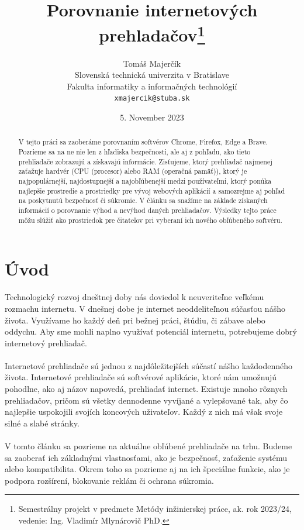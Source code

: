\documentclass[10pt,Slovak,a4paper]{article}
\title{Porovnanie internetových prehladačov\thanks{Semestrálny projekt v predmete Metódy inžinierskej práce, ak. rok 2023/24, vedenie: Ing. Vladimír Mlynárovič PhD.}} %
\author{Tomáš Majerčík\\[2pt]
	{\small Slovenská technická univerzita v Bratislave}\\
	{\small Fakulta informatiky a informačných technológií}\\
	{\small \texttt{xmajercik@stuba.sk}}
}
\date{\small 5. November 2023} %
\begin{document}
\maketitle

\begin{abstract}

V tejto práci sa zaoberáme porovnaním softvérov Chrome, Firefox, Edge a Brave. Pozrieme sa na ne nie len z hľadiska bezpečnosti, ale aj z pohľadu, ako tieto prehliadače zobrazujú a získavajú informácie. Zisťujeme, ktorý prehliadač najmenej zaťažuje hardvér (CPU (procesor) alebo RAM (operačná pamäť)), ktorý je najpopulárnejší, najdostupnejší a najobľúbenejší medzi používateľmi, ktorý ponúka najlepšie prostredie a prostriedky pre vývoj webových aplikácií a samozrejme aj pohľad na poskytnutú bezpečnosť či súkromie. V článku sa snažíme na základe získaných informácií o porovnanie výhod a nevýhod daných prehliadačov. Výsledky tejto práce môžu slúžiť ako prostriedok pre čitateľov pri vyberaní ich nového obľúbeného softvéru.


\end{abstract}



\section{Úvod}
    \begin{paragraph}
        Technologický rozvoj dneštnej doby nás doviedol k neuveriteľne veľkému rozmachu internetu. V dnešnej dobe je internet neoddeliteľnou súčasťou nášho života. Využívame ho každý deň pri bežnej práci, štúdiu, či zábave alebo oddychu. Aby sme mohli naplno využívať potenciál internetu, potrebujeme dobrý internetový prehliadač. \\ \\
        Internetové prehliadače sú jednou z najdôležitejších súčastí nášho každodenného života. Internetové prehliadače sú softvérové aplikácie, ktoré nám umožnujú pohodlne, ako aj názov napovedá, prehliadať internet. Existuje mnoho rôznych prehliadačov, pričom sú všetky dennodenne vyvíjané a vylepšované tak, aby čo najlepšie uspokojili svojích koncových uživateľov. Každý z nich má však svoje silné a slabé stránky. \\ \\
        V tomto článku sa pozrieme na aktuálne obľúbené prehliadače na trhu. Budeme sa zaoberať ich základnými vlastnosťami, ako je bezpečnosť, zaťaženie systému alebo kompatibilita. Okrem toho sa pozrieme aj na ich špeciálne funkcie, ako je podpora rozšírení, blokovanie reklám či ochrana súkromia.
    \end{paragraph}
\end{document}
